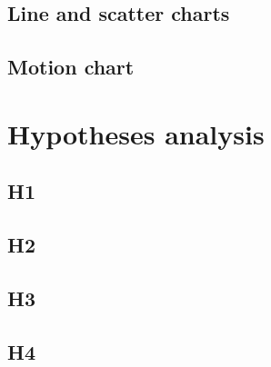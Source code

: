 %

\subsection{Line and scatter charts}


\subsection{Motion chart}


\section{Hypotheses analysis}


\subsection*{H1}

\subsection*{H2}

\subsection*{H3}

\subsection*{H4}

